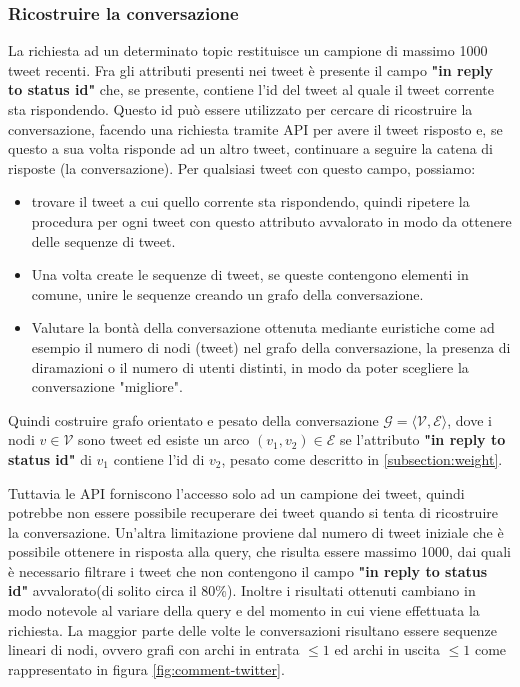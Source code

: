 \subsubsection{Ricostruire la conversazione}
\label{ricostruire-conv}
La richiesta ad un determinato topic restituisce un campione di massimo 1000 tweet recenti.
Fra gli attributi presenti nei tweet è presente il campo \textbf{"in reply to status id"} che, se presente, contiene l'id del tweet al quale il tweet corrente sta rispondendo. Questo id può essere utilizzato per cercare di ricostruire la conversazione, facendo una richiesta tramite API per avere il tweet risposto e, se questo a sua volta risponde ad un altro tweet, continuare a seguire la catena di risposte (la conversazione). Per qualsiasi tweet con questo campo, possiamo:
\begin{itemize}
    \item trovare il tweet a cui quello corrente sta rispondendo, quindi ripetere la procedura per ogni tweet con questo attributo avvalorato in modo da ottenere delle sequenze di tweet.
    \item Una volta create le sequenze di tweet, se queste contengono elementi in comune, unire le sequenze creando un grafo della conversazione.
    \item Valutare la bontà della conversazione ottenuta mediante euristiche come ad esempio il numero di nodi (tweet) nel grafo della conversazione, la presenza di diramazioni o il numero di utenti distinti, in modo da poter scegliere la conversazione "migliore".
\end{itemize}

Quindi costruire grafo orientato e pesato della conversazione $\mathcal{G = ⟨V, E⟩}$, dove i nodi $v \in \mathcal{V}$ sono tweet ed esiste un arco $(v_1,v_2) \in \mathcal{E}$ se l'attributo \textbf{"in reply to status id"} di $v_1$ contiene l'id di $v_2$, pesato come descritto in \ref{subsection:weight}.

Tuttavia le API forniscono l'accesso solo ad un campione dei tweet, quindi potrebbe non essere possibile recuperare dei tweet quando si tenta di ricostruire la conversazione. Un'altra limitazione proviene dal numero di tweet iniziale che è possibile ottenere in risposta alla query, che risulta essere massimo 1000, dai quali è necessario filtrare i tweet che non contengono il campo \textbf{"in reply to status id"} avvalorato(di solito circa il 80\%). Inoltre i risultati ottenuti cambiano in modo notevole al variare della query e del momento in cui viene effettuata la richiesta. La maggior parte delle volte le conversazioni risultano essere sequenze lineari di nodi, ovvero grafi con archi in entrata $\leq 1$ ed archi in uscita $\leq 1$ come rappresentato in figura \ref{fig:comment-twitter}.

